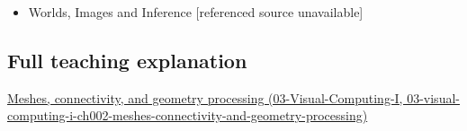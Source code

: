 \begin{itemize}
\tightlist
\item
  {Worlds, Images and Inference {[}referenced source unavailable{]}}
\end{itemize}

\subsection{Full teaching explanation}\label{appendix-1dd4ad54ca57-full-teaching-explanation}

\href{../03-Visual-Computing-I/main.pdf\#nameddest=03-visual-computing-i-ch002-meshes-connectivity-and-geometry-processing}{Meshes, connectivity, and geometry processing (03-Visual-Computing-I, 03-visual-computing-i-ch002-meshes-connectivity-and-geometry-processing)}
